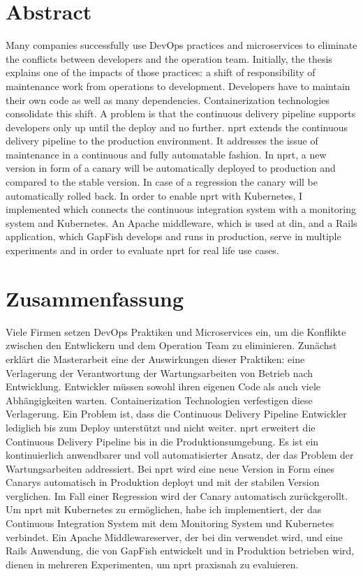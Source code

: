 \section*{Abstract}
Many companies successfully use DevOps practices and microservices to eliminate the
conflicts between developers and the operation team. Initially, the thesis explains one of
the impacts of those practices: a shift of responsibility of maintenance work from
operations to development. Developers have to maintain their own code as well as many
dependencies. Containerization technologies consolidate this shift. A problem is that the
continuous delivery pipeline supports developers only up until the deploy and no
further. \gls{nprt} extends the continuous delivery pipeline to the production
environment. It addresses the issue of maintenance in a continuous and fully automatable
fashion. In \gls{nprt}, a new version in form of a canary will be automatically deployed
to production and compared to the stable version. In case of a regression the canary will
be automatically rolled back. In order to enable \gls{nprt} with Kubernetes, I implemented
\deployer which connects the continuous integration system with a monitoring system and
Kubernetes. An Apache middleware, which is used at \gls{din}, and a Rails application,
which GapFish develops and runs in production, serve in multiple experiments and in order
to evaluate \gls{nprt} for real life use cases.
\clearpage

\section*{Zusammenfassung}
Viele Firmen setzen DevOps Praktiken und Microservices ein, um die Konflikte zwischen den
Entwlickern und dem Operation Team zu eliminieren. Zunächst erklärt die Masterarbeit eine
der Auswirkungen dieser Praktiken: eine Verlagerung der Verantwortung der Wartungsarbeiten
von Betrieb nach Entwicklung. Entwickler müssen sowohl ihren eigenen Code als auch viele
Abhängigkeiten warten. Containerization Technologien verfestigen diese Verlagerung. Ein
Problem ist, dass die Continuous Delivery Pipeline Entwickler lediglich bis zum Deploy
unterstützt und nicht weiter. \gls{nprt} erweitert die Continuous Delivery Pipeline bis in
die Produktionsumgebung. Es ist ein kontinuierlich anwendbarer und voll automatisierter
Ansatz, der das Problem der Wartungsarbeiten addressiert. Bei \gls{nprt} wird eine neue
Version in Form eines Canarys automatisch in Produktion deployt und mit der stabilen
Version verglichen. Im Fall einer Regression wird der Canary automatisch zurückgerollt. Um
\gls{nprt} mit Kubernetes zu ermöglichen, habe ich \deployer implementiert, der das
Continuous Integration System mit dem Monitoring System und Kubernetes verbindet. Ein
Apache Middlewareserver, der bei \gls{din} verwendet wird, und eine Rails Anwendung, die
von GapFish entwickelt und in Produktion betrieben wird, dienen in mehreren Experimenten,
um \gls{nprt} praxisnah zu evaluieren.
